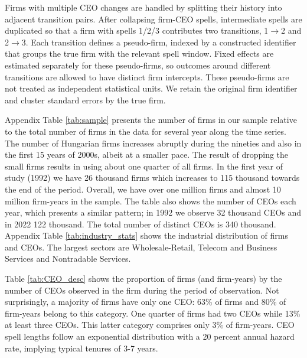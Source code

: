 \documentclass[11pt,a4paper]{article}
\begin{document}
Firms with multiple CEO changes are handled by splitting their history into adjacent transition pairs. After collapsing firm-CEO spells, intermediate spells are duplicated so that a firm with spells 1/2/3 contributes two transitions, 1$\to$2 and 2$\to$3. Each transition defines a pseudo-firm, indexed by a constructed identifier that groups the true firm with the relevant spell window. Fixed effects are estimated separately for these pseudo-firms, so outcomes around different transitions are allowed to have distinct firm intercepts. These pseudo-firms are not treated as independent statistical units. We retain the original firm identifier and cluster standard errors by the true firm. 

Appendix Table \ref{tab:sample} presents the number of firms in our sample relative to the total number of firms in the data for several year along the time series. The number of Hungarian firms increases abruptly during the nineties and also in the first 15 years of 2000s, albeit at a smaller pace.  The result of dropping the small firms results in using about one quarter of all firms. In the first year of study (1992) we have 26 thousand firms which increases to 115 thousand towards the end of the period. Overall, we have over one million firms and almost 10 million firm-years in the sample. The table also shows the number of CEOs each year, which presents a similar pattern; in 1992 we observe 32 thousand CEOs and in 2022 122 thousand. The total number of distinct CEOs is 340 thousand. Appendix Table \ref{tab:industry_stats} shows the industrial distribution of firms and CEOs. The largest sectors are Wholesale-Retail, Telecom and Business Services and Nontradable Services. 

Table \ref{tab:CEO_desc} shows the proportion of firms (and firm-years) by the number of CEOs observed in the firm during the period of observation. Not surprisingly, a majority of firms have only one CEO: 63\% of firms and 80\% of firm-years belong to this category. One quarter of firms had two CEOs while 13\% at least three CEOs. This latter category comprises only 3\% of firm-years. CEO spell lengths follow an exponential distribution with a 20 percent annual hazard rate, implying typical tenures of 3-7 years.
\end{document}
